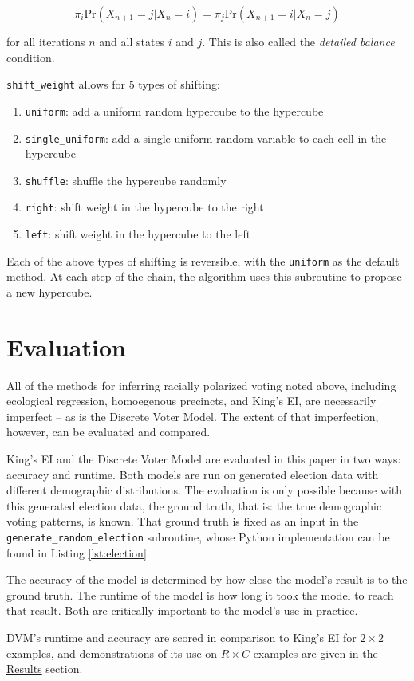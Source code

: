 $$\pi_i \text{Pr}(X_{n+1} = j | X_n = i) = \pi_j \text{Pr}(X_{n+1} = i | X_n = j)$$

for all iterations $n$ and all states $i$ and $j$. This is also called the \textit{detailed balance} condition.

\texttt{shift\_weight} allows for $5$ types of shifting:

\begin{enumerate}
  \item \texttt{uniform}: add a uniform random hypercube to the hypercube
  \item \texttt{single\_uniform}: add a single uniform random variable to each cell in the hypercube
  \item \texttt{shuffle}: shuffle the hypercube randomly
  \item \texttt{right}: shift weight in the hypercube to the right
  \item \texttt{left}: shift weight in the hypercube to the left
\end{enumerate}

Each of the above types of shifting is reversible, with the \texttt{uniform} as the default method. At each step of the chain, the algorithm uses this subroutine to propose a new hypercube.


\section{Evaluation}

All of the methods for inferring racially polarized voting noted above, including ecological regression, homoegenous precincts, and King's EI, are necessarily imperfect -- as is the Discrete Voter Model. The extent of that imperfection, however, can be evaluated and compared.

King's EI and the Discrete Voter Model are evaluated in this paper in two ways: accuracy and runtime. Both models are run on generated election data with different demographic distributions. The evaluation is only possible because with this generated election data, the ground truth, that is: the true demographic voting patterns, is known. That ground truth is fixed as an input in the \texttt{generate\_random\_election} subroutine, whose Python implementation can be found in Listing \ref{lst:election}.

The accuracy of the model is determined by how close the model's result is to the ground truth. The runtime of the model is how long it took the model to reach that result. Both are critically important to the model's use in practice.

DVM's runtime and accuracy are scored in comparison to King's EI for $2 \times 2$ examples, and demonstrations of its use on $R \times C$ examples are given in the \hyperref[sec:results]{Results} section.
